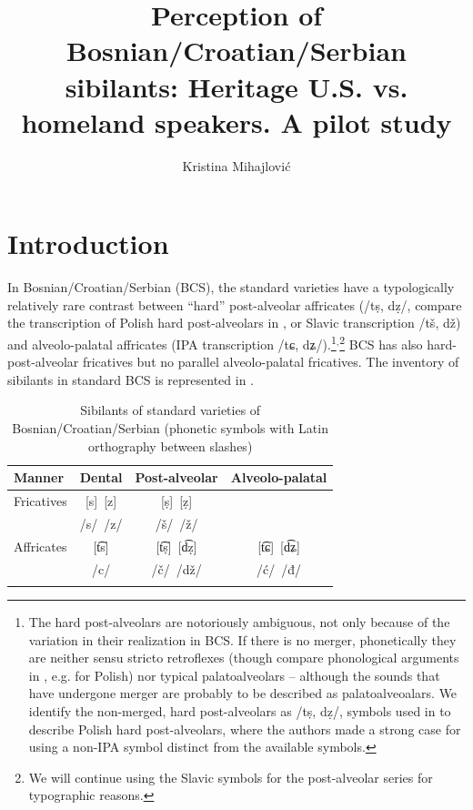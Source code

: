 \documentclass[output=paper,
modfonts,
newtxmath,
hidelinks,
]{langscibook}
\author{Kristina Mihajlović\affiliation{University of Arizona}\lastand{Małgorzata Ćavar\affiliation{Indiana University}}}
\title{Perception of Bosnian/Croatian/Serbian sibilants: Heritage U.S. vs. homeland speakers. A pilot study}
\begin{document}
\maketitle 
{}

 

\section{Introduction}

In Bosnian/Croatian/Serbian (BCS), the standard varieties have a typologically relatively rare contrast between “hard” post-alveolar affricates (/tṣ, dẓ/, compare the transcription of Polish  hard post-alveolars in \citet{Ladefoged-Disner2012}, or Slavic transcription /tš, dž) and alveolo-palatal affricates (IPA transcription /tɕ, dʑ/).\footnote{The hard post-alveolars are notoriously ambiguous, not only because of the variation in their realization in BCS. If there is no merger, phonetically they are neither sensu stricto retroflexes (though compare phonological arguments in \citealt{Hamann2003}, e.g. for Polish) nor typical palatoalveolars – although the sounds that have undergone merger are probably to be described as palatoalveoalars. We identify the non-merged, hard post-alveolars as /tṣ, dẓ/, symbols used in \citet[169]{Ladefoged-Disner2012} to describe Polish hard post-alveolars, where the authors made a strong case for using a non-IPA symbol distinct from the available symbols.}$^,$\footnote{We will continue using the Slavic symbols for the post-alveolar series for typographic reasons.} BCS has also hard-post-alveolar fricatives but no parallel alveolo-palatal fricatives. The inventory of sibilants in standard BCS is represented in .


\begin{table}
\begin{tabularx}{\textwidth}{XCCC} 
\lsptoprule 
 Manner &   {     Dental} & { Post-alveolar} & {     Alveolo-palatal}\\
\midrule 
Fricatives & [s]~[z]& [ṣ]~[ẓ] \\
           & /s/~/z/& /š/~/ž/ \\
\tablevspace           
Affricates & [t͡s]   & [t͡ṣ]~[d͡ẓ] & [t͡ɕ]~[d͡ʑ]\\
           & /c/    & /č/~/dž/  & /ć/~/đ/\\
\lspbottomrule
\end{tabularx}
\caption{\label{tab:mihajlovic:1} Sibilants of standard varieties of Bosnian/Croatian/Serbian (phonetic symbols with Latin orthography between slashes)}
\end{table}
\end{document}
